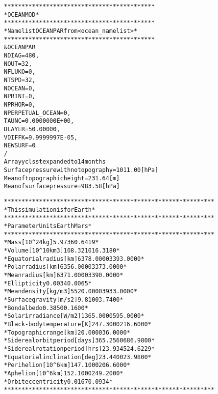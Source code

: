 \begin{alltt}
 *******************************************
 * OCEANMOD                                *
 *******************************************
 * Namelist OCEANPAR from <ocean_namelist> *
 *******************************************
 &OCEANPAR
 NDIAG   =         480,
 NOUT    =          32,
 NFLUKO  =           0,
 NTSPD   =          32,
 NOCEAN  =           0,
 NPRINT  =           0,
 NPRHOR  =           0,
 NPERPETUAL_OCEAN        =           0,
 TAUNC   =  0.0000000E+00,
 DLAYER  =   50.00000    ,
 VDIFFK  =  9.9999997E-05,
 NEWSURF =           0
 /
 Array {yclsst} expanded to 14 months
 Surface pressure with no topography =    1011.00 [hPa]
 Mean of topographic height          =     231.64 [m]
 Mean of surface pressure            =     983.58 [hPa]


************************************************************
* This simulation is for Earth                             *
************************************************************
*                Parameter       Units     Earth      Mars *
************************************************************
*                     Mass  [10^24 kg]    5.9736    0.6419 *
*                   Volume [10^10 km3]  108.3210   16.3180 *
*        Equatorial radius        [km] 6378.0000 3393.0000 *
*             Polar radius        [km] 6356.0000 3373.0000 *
*              Mean radius        [km] 6371.0000 3390.0000 *
*              Ellipticity                0.0034    0.0065 *
*             Mean density     [kg/m3] 5520.0000 3933.0000 *
*          Surface gravity      [m/s2]    9.8100    3.7400 *
*              Bond albedo                0.3850    0.1600 *
*         Solar irradiance      [W/m2] 1365.0000  595.0000 *
*   Black-body temperature         [K]  247.3000  216.6000 *
*        Topographic range        [km]   20.0000   36.0000 *
*    Sidereal orbit period      [days]  365.2560  686.9800 *
* Sidereal rotation period       [hrs]   23.9345   24.6229 *
*   Equatorial inclination       [deg]   23.4400   23.9800 *
*               Perihelion   [10^6 km]  147.1000  206.6000 *
*                 Aphelion   [10^6 km]  152.1000  249.2000 *
*       Orbit eccentricity                0.0167    0.0934 *
************************************************************
 

\end{alltt}
